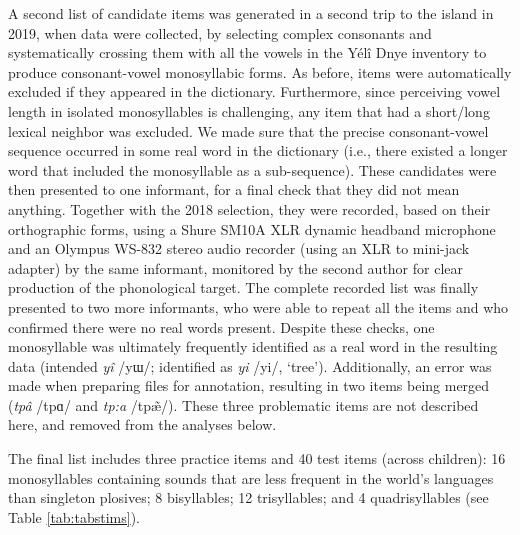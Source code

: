 \documentclass[
  american,
  ,man,floatsintext]{apa6}
\begin{document}
A second list of candidate items was generated in a second trip to the island in 2019, when data were collected, by selecting complex consonants and systematically crossing them with all the vowels in the Yélî Dnye inventory to produce consonant-vowel monosyllabic forms. As before, items were automatically excluded if they appeared in the dictionary. Furthermore, since perceiving vowel length in isolated monosyllables is challenging, any item that had a short/long lexical neighbor was excluded. We made sure that the precise consonant-vowel sequence occurred in some real word in the dictionary (i.e., there existed a longer word that included the monosyllable as a sub-sequence). These candidates were then presented to one informant, for a final check that they did not mean anything. Together with the 2018 selection, they were recorded, based on their orthographic forms, using a Shure SM10A XLR dynamic headband microphone and an Olympus WS-832 stereo audio recorder (using an XLR to mini-jack adapter) by the same informant, monitored by the second author for clear production of the phonological target. The complete recorded list was finally presented to two more informants, who were able to repeat all the items and who confirmed there were no real words present. Despite these checks, one monosyllable was ultimately frequently identified as a real word in the resulting data (intended \emph{yî} /yɯ/; identified as \emph{yi} /yi/, `tree'). Additionally, an error was made when preparing files for annotation, resulting in two items being merged (\emph{tpâ} /tpɑ/ and \emph{tp:a} /tpæ̃/). These three problematic items are not described here, and removed from the analyses below.

The final list includes three practice items and 40 test items (across children): 16 monosyllables containing sounds that are less frequent in the world's languages than singleton plosives; 8 bisyllables; 12 trisyllables; and 4 quadrisyllables (see Table \ref{tab:tabstims}).
\end{document}
